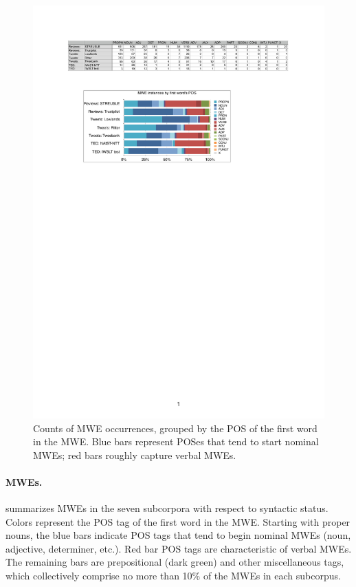 \documentclass[11pt,letterpaper]{article}
\begin{document}
\begin{figure}
\includegraphics[width=\columnwidth]{figs/mwes-pos.pdf}
\caption{Counts of MWE occurrences, grouped by the POS of the first word in the MWE. 
Blue bars represent POSes that tend to start nominal MWEs; red bars roughly capture verbal MWEs.}
\label{fig:mwes-pos}
\end{figure}

\paragraph{MWEs.}  summarizes MWEs in the seven subcorpora with respect to syntactic status. 
Colors represent the POS tag of the first word in the MWE. 
Starting with proper nouns, the blue bars indicate POS tags that tend to begin nominal MWEs (noun, adjective, determiner, etc.).
Red bar POS tags are characteristic of verbal MWEs. The remaining bars are prepositional (dark green) 
and other miscellaneous tags, which collectively comprise no more than 10\% of the MWEs in each subcorpus.
\end{document}
